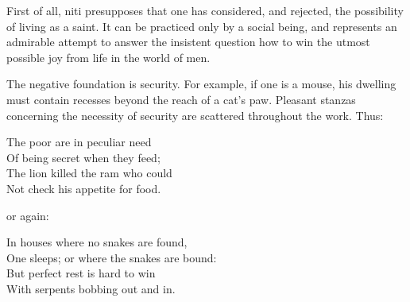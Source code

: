 First of all, niti presupposes that one has considered, and rejected,
the possibility of living as a saint. It can be practiced only by a
social being, and represents an admirable attempt to answer the
insistent question how to win the utmost possible joy from life in the
world of men.

The negative foundation is security. For example,
if one is a mouse, his dwelling must contain recesses
beyond the reach of a cat's paw. Pleasant stanzas
concerning the necessity of security are scattered
throughout the work. Thus:
\begin{pverse}
The poor are in peculiar need\\
Of being secret when they feed;\\
The lion killed the ram who could\\
Not check his appetite for food.
\end{pverse}
or again:
\begin{pverse}
In houses where no snakes are found,\\
One sleeps; or where the snakes are bound:\\
But perfect rest is hard to win\\
With serpents bobbing out and in.
\end{pverse}

